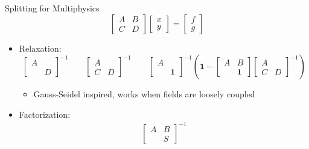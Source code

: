 \begin{frame}{Splitting for Multiphysics}
  \begin{equation*}
    \begin{bmatrix}
      A & B \\ C & D
    \end{bmatrix}
    \begin{bmatrix}
      x \\ y
    \end{bmatrix}
    =
    \begin{bmatrix}
      f \\ g
    \end{bmatrix}
  \end{equation*}
  \begin{itemize}\item Relaxation:
    \begin{equation*}
      \begin{bmatrix}
        A & \\  & D
      \end{bmatrix}^{-1} \qquad 
      \begin{bmatrix}
        A & \\ C & D
      \end{bmatrix}^{-1} \qquad
      \begin{bmatrix}
        A & \\  & \bm 1
      \end{bmatrix}^{-1}
      \left(
        \bm 1 -
        \begin{bmatrix}
          A & B \\ & \bm 1
        \end{bmatrix}
        \begin{bmatrix}
          A & \\ C & D
        \end{bmatrix}^{-1}
      \right)
    \end{equation*}
    \begin{itemize}
    \item Gauss-Seidel inspired, works when fields are loosely coupled
    \end{itemize}
  \item Factorization: 
    \begin{align*}
      \begin{bmatrix}
        A & B \\ & S
      \end{bmatrix}^{-1}

\end{align*}
\end{itemize}
\end{frame}

